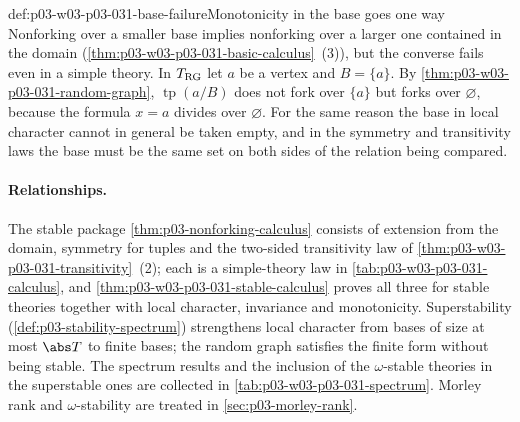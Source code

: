 \begin{hbwarning}{def:p03-w03-p03-031-base-failure}{Monotonicity in the base goes one way}
Nonforking over a smaller base implies nonforking over a larger one
contained in the domain (\cref{thm:p03-w03-p03-031-basic-calculus}~(3)),
but the converse fails even in a simple theory.  In \(T_{\rm RG}\) let
\(a\) be a vertex and \(B=\{a\}\).  By
\cref{thm:p03-w03-p03-031-random-graph}, \(\operatorname{tp}(a/B)\) does
not fork over \(\{a\}\) but forks over \(\varnothing\), because the
formula \(x=a\) divides over \(\varnothing\).  For the same reason the
base in local character cannot in general be taken empty, and in the
symmetry and transitivity laws the base must be the same set on both
sides of the relation being compared.
\end{hbwarning}

\paragraph{Relationships.}
The stable package \cref{thm:p03-nonforking-calculus} consists of
extension from the domain, symmetry for tuples and the two-sided
transitivity law of \cref{thm:p03-w03-p03-031-transitivity}~(2); each is a
simple-theory law in \cref{tab:p03-w03-p03-031-calculus}, and
\cref{thm:p03-w03-p03-031-stable-calculus} proves all three for stable
theories together with local character, invariance and monotonicity.  Superstability
(\cref{def:p03-stability-spectrum}) strengthens local character from
bases of size at most \(\abs T\) to finite bases; the random graph
satisfies the finite form without being stable.  The spectrum results and
the inclusion of the \(\omega\)-stable theories in the superstable ones
are collected in \cref{tab:p03-w03-p03-031-spectrum}.  Morley rank and
\(\omega\)-stability are treated in \cref{sec:p03-morley-rank}.

